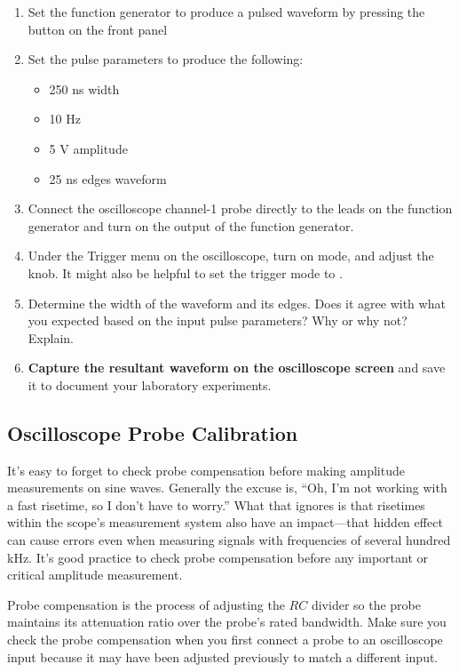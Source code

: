 \documentclass[12pt]{../manual}
\begin{document}
\begin{enumerate}
\item Set the function generator to produce a pulsed waveform by pressing the  button on the front panel
\item Set the pulse parameters to produce the following: 
\begin{itemize}
\item 250 ns width
\item 10 Hz
\item 5 V amplitude
\item 25 ns edges waveform
\end{itemize}
\item Connect the oscilloscope channel-1 probe directly to the leads on the function generator and turn on the output of the function generator.
\item Under the Trigger menu on the oscilloscope, turn on  mode, and adjust the  knob. It might also be helpful to set the trigger mode to  . 
\item Determine the width of the waveform and its edges. Does it agree with what you expected based on the input pulse parameters? Why or why not? Explain.
\item \textbf{Capture the resultant waveform on the oscilloscope screen} and save it to document your laboratory experiments.
\end{enumerate}

\subsection{Oscilloscope Probe Calibration}
It's easy to forget to check probe compensation before making amplitude measurements on sine waves. Generally the excuse is, ``Oh, I'm not working with a fast risetime, so I don't have to worry.''  What that ignores is that risetimes within the scope's measurement system also have an impact---that hidden effect can cause errors even when measuring signals with frequencies of several hundred kHz. It's good practice to check probe compensation before any important or critical amplitude measurement. 

Probe compensation is the process of adjusting the $RC$ divider so the probe maintains its attenuation ratio over the probe's rated bandwidth. Make sure you check the probe compensation when you first connect a probe to an oscilloscope input because it may have been adjusted previously to match a different input.   
\end{document}
